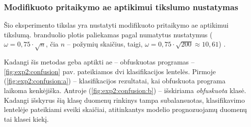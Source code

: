 \subsubsection{Modifikuoto \LIME pritaikymo \gls{ae} aptikimui tikslumo nustatymas}\label{sec:exp:2}

Šio eksperimento tikslas yra nustatyti modifikuoto \LIME pritaikymo \gls{ae} aptikimui  tikslumą. \LIME branduolio plotis paliekamas pagal numatytus nustatymus ($\omega = 0,75 \cdot \sqrt{n}$, čia $n$ -- požymių skaičius, taigi, $\omega = 0,75 \cdot \sqrt{200} \approx 10,61$) \cite{ribeiroWhyShouldTrust2016}.

Kadangi šis metodas geba aptikti \gls{ae} -- obfuskuotas programas --
\ref{fig:exp2:confusion} pav. pateikiamos dvi klasifikacijos lentelės. Pirmoje (\ref{fig:exp2:confusion:a}) -- klasifikacijos rezultatai, kai obfuskuota programa laikoma kenkėjiška. Antroje (\ref{fig:exp2:confusion:b}) -- išskiriama \textit{obfuskuota} klasė. Kadangi išskyrus šią klasę duomenų rinkinys tampa subalansuotas, klasifikavimo lentelėje pateikiami sveiki skaičiai, atitinkantys modelio prognozuojamų duomenų tai klasei kiekį.

